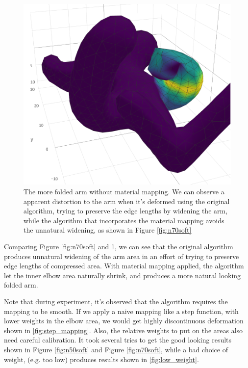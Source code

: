 \documentclass{6838publ}
\begin{document}
\begin{figure}[t!]  \centering
  \includegraphics[width=.6\linewidth]{n70rigid}
\caption{The more folded arm without material mapping.  We can observe
a apparent distortion to the arm when it's deformed using the original
algorithm, trying to preserve the edge lengths by widening the arm,
while the algorithm that incorporates the material mapping avoids the
unnatural widening, as shown in Figure \ref{fig:n70soft}}
  \label{fig:n70rigid}
\end{figure} Comparing Figure \ref{fig:n70soft} and
\ref{fig:n70rigid}, we can see that the original algorithm produces
unnatural widening of the arm area in an effort of trying to preserve
edge lengths of compressed area. With material mapping applied, the
algorithm let the inner elbow area naturally shrink, and produces a
more natural looking folded arm.
\par Note that during experiment, it's observed that the algorithm
requires the mapping to be smooth. If we apply a naive mapping like a
step function, with lower weights in the elbow area, we would get
highly discontinuous deformation shown in
\ref{fig:step_mapping}. Also, the relative weights to put on the areas
also need careful calibration. It took several tries to get the
good looking results shown in Figure \ref{fig:n50soft} and Figure
\ref{fig:n70soft}, while a bad choice of weight, (e.g. too low)
produces results shown in \ref{fig:low_weight}.
\end{document}

